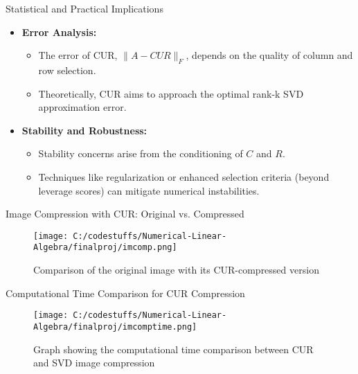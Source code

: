 \documentclass[pdf]{beamer}
\begin{document}
\begin{frame}{Statistical and Practical Implications}
    \begin{itemize}
        \item \textbf{Error Analysis:}
            \begin{itemize}
                \item The error of CUR, \( \| A - CUR \|_F \), depends on the quality of column and row selection.
                \item Theoretically, CUR aims to approach the optimal rank-k SVD approximation error.
            \end{itemize}
        \item \textbf{Stability and Robustness:}
            \begin{itemize}
                \item Stability concerns arise from the conditioning of \( C \) and \( R \).
                \item Techniques like regularization or enhanced selection criteria (beyond leverage scores) can mitigate numerical instabilities.
            \end{itemize}
    \end{itemize}
\end{frame}

\begin{frame}{Image Compression with CUR: Original vs. Compressed}
    \begin{figure}
        \centering
        \texttt{[image: C:/codestuffs/Numerical-Linear-Algebra/finalproj/imcomp.png]}
        \caption{Comparison of the original image with its CUR-compressed version}
        \label{fig:lena_compression}
    \end{figure}
\end{frame}

\begin{frame}{Computational Time Comparison for CUR Compression}
    \begin{figure}
        \centering
        \texttt{[image: C:/codestuffs/Numerical-Linear-Algebra/finalproj/imcomptime.png]}
        \caption{Graph showing the computational time comparison between CUR and SVD image compression}
        \label{fig:compression_time}
    \end{figure}
\end{frame}
\end{document}
